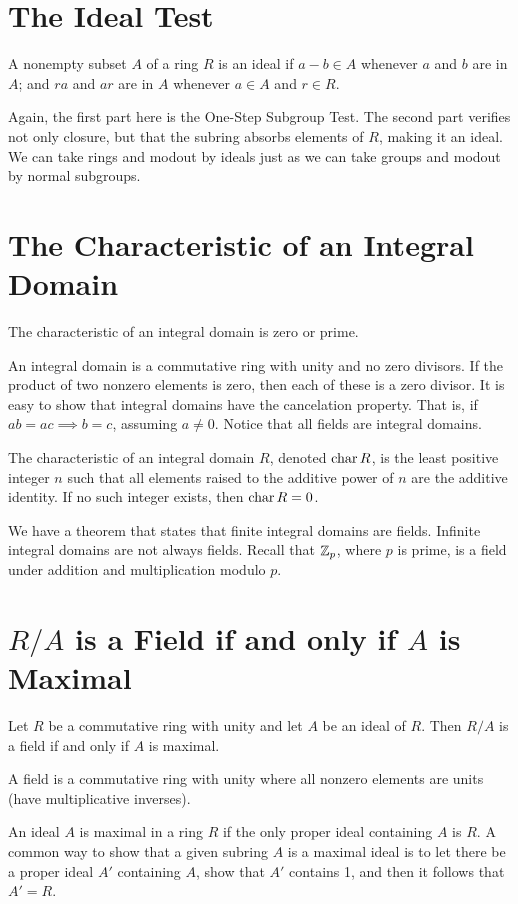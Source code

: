 \documentclass{article}
\begin{document}
\section*{The Ideal Test}

A nonempty subset $A$ of a ring $R$ is an ideal if $a-b\in A$
whenever $a$ and $b$ are in $A$; and $ra$ and $ar$
are in $A$ whenever $a\in A$ and $r\in R$.

Again, the first part here is the One-Step Subgroup Test.
The second part verifies not only closure, but that the
subring absorbs elements of $R$, making it an ideal.
We can take rings and modout by ideals just as we can
take groups and modout by normal subgroups.

\section*{The Characteristic of an Integral Domain}

The characteristic of an integral domain is zero or prime.

An integral domain is a commutative ring with unity and
no zero divisors.  If the product of two nonzero elements
is zero, then each of these is a zero divisor.
It is easy to show that integral domains have the cancelation
property.  That is, if $ab=ac\implies b=c$, assuming $a\neq 0$.
Notice that all fields are integral domains.

The characteristic of an integral domain $R$, denoted
$\mbox{char}\, R$, is the least positive integer $n$ such that
all elements raised to the additive power of $n$ are the
additive identity.  If no such integer exists, then
$\mbox{char}\, R=0$.

We have a theorem that states that finite integral domains
are fields.  Infinite integral domains are not always fields.
Recall that $\mathbb{Z}_p$, where $p$ is prime, is a field under
addition and multiplication modulo $p$.

\section*{$R/A$ is a Field if and only if $A$ is Maximal}

Let $R$ be a commutative ring with unity and let $A$
be an ideal of $R$.  Then $R/A$ is a field if and only if
$A$ is maximal.

A field is a commutative ring with unity where all nonzero
elements are units (have multiplicative inverses).

An ideal $A$ is maximal in a ring $R$ if the only
proper ideal containing $A$ is $R$.  A common way
to show that a given subring $A$ is a maximal ideal is to let
there be a proper ideal $A'$ containing $A$, show
that $A'$ contains 1, and then it follows that $A'=R$.
\end{document}
